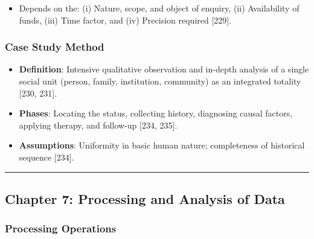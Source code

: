 \documentclass[
]{article}
\providecommand{\tightlist}{%
  \setlength{\itemsep}{0pt}\setlength{\parskip}{0pt}}
\begin{document}
\begin{itemize}
\tightlist
\item
  Depends on the: (i) Nature, scope, and object of enquiry, (ii)
  Availability of funds, (iii) Time factor, and (iv) Precision required
  {[}229{]}.
\end{itemize}

\subsubsection{Case Study Method}\label{case-study-method}

\begin{itemize}
\tightlist
\item
  \textbf{Definition}: Intensive qualitative observation and in-depth
  analysis of a single social unit (person, family, institution,
  community) as an integrated totality {[}230, 231{]}.
\item
  \textbf{Phases}: Locating the status, collecting history, diagnosing
  causal factors, applying therapy, and follow-up {[}234, 235{]}.
\item
  \textbf{Assumptions}: Uniformity in basic human nature; completeness
  of historical sequence {[}234{]}.
\end{itemize}

\begin{center}\rule{0.5\linewidth}{0.5pt}\end{center}

\subsection{Chapter 7: Processing and Analysis of
Data}\label{chapter-7-processing-and-analysis-of-data}

\subsubsection{Processing Operations}\label{processing-operations}
\end{document}
